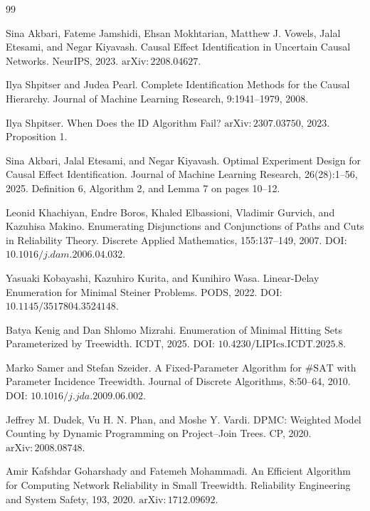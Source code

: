 \documentclass{article}
\begin{document}
\begin{thebibliography}{99}

   Sina Akbari, Fateme Jamshidi, Ehsan Mokhtarian, Matthew J. Vowels, Jalal Etesami, and Negar Kiyavash. Causal Effect Identification in Uncertain Causal Networks. NeurIPS, 2023. \(\mathrm{arXiv}:2208.04627\).

   Ilya Shpitser and Judea Pearl. Complete Identification Methods for the Causal Hierarchy. Journal of Machine Learning Research, 9:1941--1979, 2008.

   Ilya Shpitser. When Does the ID Algorithm Fail? \(\mathrm{arXiv}:2307.03750\), 2023. Proposition 1.

   Sina Akbari, Jalal Etesami, and Negar Kiyavash. Optimal Experiment Design for Causal Effect Identification. Journal of Machine Learning Research, 26(28):1--56, 2025. Definition 6, Algorithm 2, and Lemma 7 on pages 10--12.

   Leonid Khachiyan, Endre Boros, Khaled Elbassioni, Vladimir Gurvich, and Kazuhisa Makino. Enumerating Disjunctions and Conjunctions of Paths and Cuts in Reliability Theory. Discrete Applied Mathematics, 155:137--149, 2007. DOI: \(10.1016/j.dam.2006.04.032\).

   Yasuaki Kobayashi, Kazuhiro Kurita, and Kunihiro Wasa. Linear-Delay Enumeration for Minimal Steiner Problems. PODS, 2022. DOI: \(10.1145/3517804.3524148\).

   Batya Kenig and Dan Shlomo Mizrahi. Enumeration of Minimal Hitting Sets Parameterized by Treewidth. ICDT, 2025. DOI: \(10.4230/\mathrm{LIPIcs}.\mathrm{ICDT}.2025.8\).

   Marko Samer and Stefan Szeider. A Fixed-Parameter Algorithm for \(\#\mathrm{SAT}\) with Parameter Incidence Treewidth. Journal of Discrete Algorithms, 8:50--64, 2010. DOI: \(10.1016/j.jda.2009.06.002\).

   Jeffrey M. Dudek, Vu H. N. Phan, and Moshe Y. Vardi. DPMC: Weighted Model Counting by Dynamic Programming on Project--Join Trees. CP, 2020. \(\mathrm{arXiv}:2008.08748\).

   Amir Kafshdar Goharshady and Fatemeh Mohammadi. An Efficient Algorithm for Computing Network Reliability in Small Treewidth. Reliability Engineering and System Safety, 193, 2020. \(\mathrm{arXiv}:1712.09692\).


\end{thebibliography}
\end{document}
